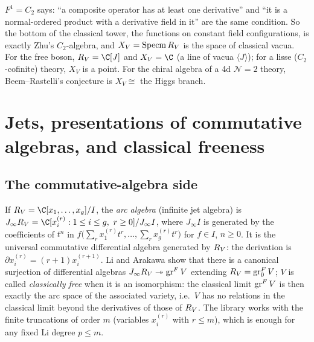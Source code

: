 \begin{physics}
$F^1 = C_2$ says: ``a composite operator has at least one derivative'' and ``it is a normal-ordered product
with a derivative field in it'' are the same condition. So the bottom of the classical tower, the functions
on constant field configurations, is exactly Zhu's $C_2$-algebra, and $X_V = \operatorname{Specm}R_V$
is the space of classical vacua. For the free boson, $\lelevenR = \C[J]$ and $X_V = \C$ (a line of vacua
$\langle J\rangle$); for a lisse ($C_2$-cofinite) theory, $X_V$ is a point. For the chiral algebra of a 4d
$\mathcal N=2$ theory, Beem--Rastelli's conjecture is $X_V\cong$ the Higgs branch.
\end{physics}


\section{Jets, presentations of commutative algebras, and classical freeness}\label{l11:sec:jets}

\subsection{The commutative-algebra side}

If $\lelevenR = \C[x_1,\dots,x_g]/I$, the \emph{arc algebra} (infinite jet algebra) is
$J_\infty\lelevenR = \C[x_i^{(r)} : 1\le i\le g,\ r\ge0]/J_\infty I$, where $J_\infty I$ is generated by the
coefficients of $t^n$ in $f\bigl(\sum_rx_1^{(r)}t^r,\dots,\sum_rx_g^{(r)}t^r\bigr)$ for $f\in I$, $n\ge0$. It is
the universal commutative differential algebra generated by $R_V$: the derivation is
$\partial x_i^{(r)} = (r+1)x_i^{(r+1)}$. Li and Arakawa show that there is a canonical surjection of differential
algebras $J_\infty R_V\twoheadrightarrow\operatorname{gr}^FV$ extending $R_V = \operatorname{gr}^F_0V$; $V$ is called
\emph{classically free} when it is an isomorphism: the classical limit $\operatorname{gr}^FV$ is then exactly the arc space of the
associated variety, i.e.\ $V$ has no relations in the classical limit beyond the derivatives of those of $R_V$. The library works with the finite truncations of order $m$
(variables $x_i^{(r)}$ with $r\le m$), which is enough for any fixed Li degree $p\le m$.

